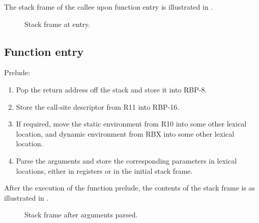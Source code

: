 The stack frame of the callee upon function entry is illustrated in
.

\begin{figure}
\begin{center}
\end{center}
\caption{\label{fig-x86-64-alternative-stack-frame-at-entry}
Stack frame at entry.}
\end{figure}

\subsection{Function entry}

Prelude:

\begin{enumerate}
\item Pop the return address off the stack and store it into RBP-8.
\item Store the call-site descriptor from R11 into RBP-16.
\item If required, move the static environment from R10 into some
  other lexical location, and dynamic environment from RBX into some
  other lexical location.
\item Parse the arguments and store the corresponding parameters in
  lexical locations, either in registers or in the initial stack
  frame.
\end{enumerate}

After the execution of the function prelude, the contents of the stack
frame is as illustrated in
.

\begin{figure}
\begin{center}
\end{center}
\caption{\label{fig-x86-64-alternative-stack-frame-after-arguments-parsed}
Stack frame after arguments parsed.}
\end{figure}

